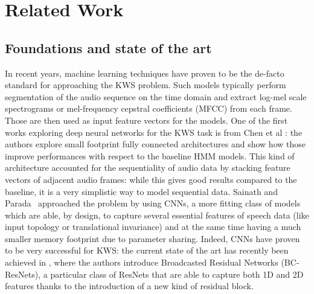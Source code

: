 
\section{Related Work}
\label{sec:related_work}

\subsection{Foundations and state of the art}

In recent years, machine learning techniques have proven to be the de-facto standard for approaching the KWS problem. Such models typically perform segmentation of the audio sequence on the time domain and extract log-mel scale spectrograms or mel-frequency cepstral coefficients (MFCC) \cite{mfccs1980davis} from each frame. Those are then used as input feature vectors for the models.
One of the first works exploring deep neural networks for the KWS task is from Chen et al \cite{dnns2014chen}: the authors explore small footprint fully connected architectures and show how those improve performances with respect to the baseline HMM models. This kind of architecture accounted for the sequentiality of audio data by stacking feature vectors of adjacent audio frames: while this gives good results compared to the baseline, it is a very simplistic way to model sequential data. Sainath and Parada~\cite{convnns2015sainath} approached the problem by using CNNs, a more fitting class of models which are able, by design, to capture several essential features of speech data (like input topology or translational invariance) and at the same time having a much smaller memory footprint due to parameter sharing. Indeed, CNNs have proven to be very successful for KWS: the current state of the art has recently been achieved in \cite{kim2021broadcasted}, where the authors introduce Broadcasted Residual Networks (BC-ResNets), a particular class of ResNets that are able to capture both 1D and 2D features thanks to the introduction of a new kind of residual block.

